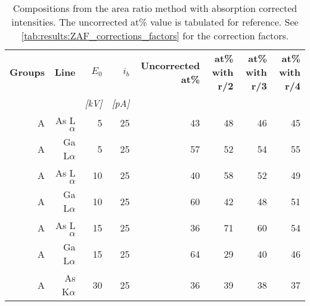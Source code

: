 \begin{table}[phtb]
    \begin{center}
        \caption{
            Compositions from the area ratio method with absorption corrected intensities. The uncorrected at\% value is tabulated for reference.
            See \cref{tab:results:ZAF_corrections_factors} for the correction factors.
        }
        \label{tab:results:ZAF_corrections_compositions}
        \begin{tabular}{rrrrrrrr}
            \hline
            \textbf{Groups} & \textbf{Line} & \textbf{$E_0$} & \textbf{$i_b$} & \textbf{Uncorrected at\%} & \textbf{at\% with r/2} & \textbf{at\% with r/3} & \textbf{at\% with r/4} \\
            \emph{}         & \emph{}       & \emph{[kV]}    & \emph{[pA]}    & \emph{}                   & \emph{}                & \emph{}                & \emph{}                \\
            \hline
            A               & As L$\alpha$  & 5              & 25             & 43                        & 48                     & 46                     & 45                     \\
            A               & Ga L$\alpha$  & 5              & 25             & 57                        & 52                     & 54                     & 55                     \\
            A               & As L$\alpha$  & 10             & 25             & 40                        & 58                     & 52                     & 49                     \\
            A               & Ga L$\alpha$  & 10             & 25             & 60                        & 42                     & 48                     & 51                     \\
            A               & As L$\alpha$  & 15             & 25             & 36                        & 71                     & 60                     & 54                     \\
            A               & Ga L$\alpha$  & 15             & 25             & 64                        & 29                     & 40                     & 46                     \\
            A               & As K$\alpha$  & 30             & 25             & 36                        & 39                     & 38                     & 37                     \\

\end{tabular}
\end{center}
\end{table}
